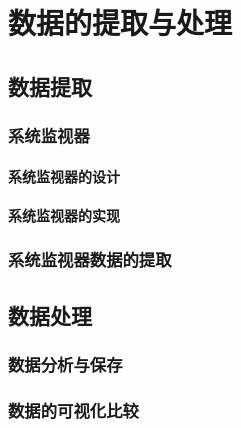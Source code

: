 

\chapter{数据的提取与处理}

\section{数据提取}

\subsection{系统监视器}

\subsubsection{系统监视器的设计}
\subsubsection{系统监视器的实现}

\subsection{系统监视器数据的提取}

\section{数据处理}

\subsection{数据分析与保存}


\subsection{数据的可视化比较}


